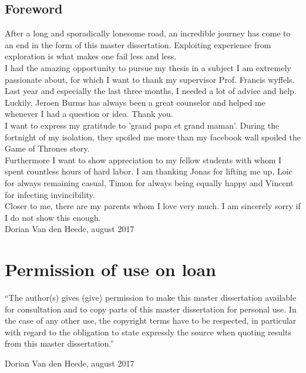 
\begin{slshape}
\subsection*{Foreword}
\renewcommand{\baselinestretch}{1.2}
\small\normalsize

\npar 
After a long and sporadically lonesome road, an incredible journey has come to an end in the form of this master dissertation. Exploiting experience from exploration is what makes one fail less and less. \\

I had the amazing opportunity to pursue my thesis in a subject I am extremely passionate about, for which I want to thank my supervisor Prof. Francis wyffels.\\

Last year and especially the last three months, I needed a lot of advice and help. Luckily, Jeroen Burms has always been a great counselor and helped me whenever I had a question or idea. Thank you.\\

I want to express my gratitude to 'grand papa et grand maman'. During the fortnight of my isolation, they spoiled me more than my facebook wall spoiled the Game of Thrones story.\\

Furthermore I want to show appreciation to my fellow students with whom I spent countless hours of hard labor. I am thanking Jonas for lifting me up, Loic for always remaining casual, Timon for always being equally happy and Vincent for infecting invincibility.\\

Closer to me, there are my parents whom I love very much. I am sincerely sorry if I do not show this enough.\\

\noindent Dorian Van den Heede, august 2017
\end{slshape}

\newpage
\section*{Permission of use on loan}

\vspace{1.5cm}

\noindent
``The author(s) gives (give) permission to make this master dissertation available for consultation
and to copy parts of this master dissertation for personal use.
 In the case of any other use, the copyright terms have to be respected, in particular with regard to
the obligation to state expressly the source when quoting results from this master dissertation.''

\addvspace{4cm}

\noindent Dorian Van den Heede, august 2017
